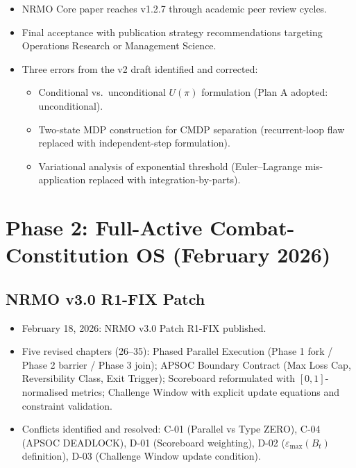 \begin{itemize}
\item NRMO Core paper reaches v1.2.7 through academic peer review
cycles.
\item Final acceptance with publication strategy recommendations
targeting Operations Research or Management Science.
\item Three errors from the v2 draft identified and corrected:
\begin{itemize}
\item Conditional vs.~unconditional $U(\pi)$ formulation (Plan A
adopted: unconditional).
\item Two-state MDP construction for CMDP separation (recurrent-loop
flaw replaced with independent-step formulation).
\item Variational analysis of exponential threshold (Euler--Lagrange
mis-application replaced with integration-by-parts).
\end{itemize}
\end{itemize}

\section{Phase 2: Full-Active Combat-Constitution OS
(February 2026)}
\label{sec:session-log-phase-2}

\subsection*{NRMO v3.0 R1-FIX Patch}

\begin{itemize}
\item February 18, 2026: NRMO v3.0 Patch R1-FIX published.
\item Five revised chapters (26--35): Phased Parallel Execution
(Phase 1 fork / Phase 2 barrier / Phase 3 join); APSOC Boundary
Contract (Max Loss Cap, Reversibility Class, Exit Trigger);
Scoreboard reformulated with $[0,1]$-normalised metrics; Challenge
Window with explicit update equations and constraint validation.
\item {\raggedright Conflicts identified and resolved: C-01 (Parallel vs Type
ZERO), C-04 (APSOC DEADLOCK), D-01 (Scoreboard weighting), D-02
($\varepsilon_{\max}(B_t)$ definition), D-03 (Challenge Window
update condition).\par}
\end{itemize}

